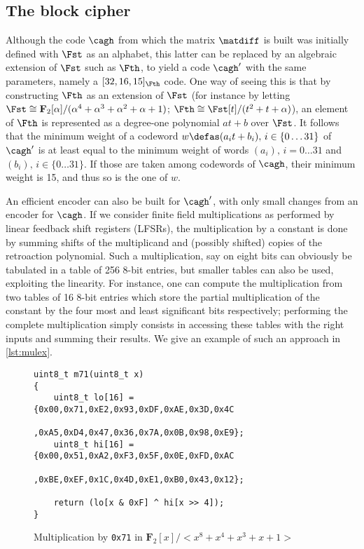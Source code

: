\subsection{The \eric block cipher}
Although the code $\cagh$ from which the matrix $\matdiff$ is built was initially defined with $\Fst$ as an alphabet, this latter
can be replaced by an algebraic extension of $\Fst$ such as $\Fth$, to yield a code $\cagh'$ with the same parameters,
namely a $[32, 16, 15]_{\Fth}$ code. One way of seeing this is that by constructing $\Fth$ as an extension of $\Fst$
(for instance by letting $\Fst \cong \mathbf{F}_2[\alpha]/(\alpha^4 + \alpha^3 + \alpha^2 + \alpha + 1)$;
$\Fth \cong \Fst[t]/(t^2 + t + \alpha)$), an
element of $\Fth$ is represented as a degree-one polynomial $at + b$ over $\Fst$.
It follows that the minimum weight of a codeword $w \defas (a_i t + b_i),\,i \in \{0\ldots31\}$ of $\cagh'$ is at least equal to the
minimum weight of words $(a_i),\,i = 0\ldots31$ and $(b_i),\,i \in \{0\ldots31\}$.
If those are taken among codewords
of $\cagh$, their minimum weight is 15, and thus so is the one of $w$.

An efficient encoder can also be built for $\cagh'$, with only small changes from an encoder for $\cagh$.
If we consider finite field multiplications as performed by linear feedback shift registers (LFSRs), the multiplication by
a constant is done by summing shifts of the multiplicand and (possibly shifted) copies of the retroaction polynomial. Such a
multiplication, say on eight bits can obviously be tabulated in a table of 256 8-bit entries, but smaller tables can also
be used, exploiting the linearity. For instance, one can compute the multiplication from two tables of 16 8-bit entries which store the partial
multiplication of the constant by the four most and least significant bits respectively; performing the complete multiplication
simply consists in accessing these tables with the right inputs and summing their results. We give an example of such
an approach
in \autoref{lst:mulex}.

\begin{figure}[!htb]
\begin{center}
\begin{verbatim}
uint8_t m71(uint8_t x)
{
    uint8_t lo[16] = {0x00,0x71,0xE2,0x93,0xDF,0xAE,0x3D,0x4C
                     ,0xA5,0xD4,0x47,0x36,0x7A,0x0B,0x98,0xE9};
    uint8_t hi[16] = {0x00,0x51,0xA2,0xF3,0x5F,0x0E,0xFD,0xAC
                     ,0xBE,0xEF,0x1C,0x4D,0xE1,0xB0,0x43,0x12};

    return (lo[x & 0xF] ^ hi[x >> 4]);
}
\end{verbatim}
\end{center}
\caption{Multiplication by \texttt{0x71} in $\mathbf{F}_{2}[x]/<x^8+x^4+x^3+x+1>$\label{lst:mulex}}
\end{figure}

